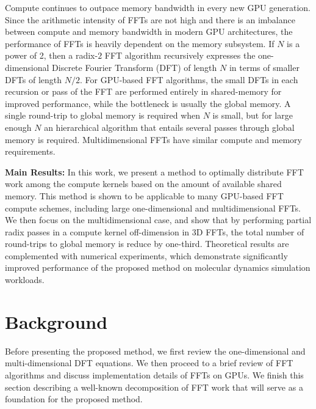 \documentclass{gtac}
\theoremstyle{problemstyle}
\begin{document}
Compute continues to outpace memory bandwidth in every new GPU
generation. Since the arithmetic intensity of FFTs are not high and
there is an imbalance between compute and memory bandwidth in modern GPU
architectures, the performance of FFTs is heavily dependent on the
memory subsystem. If $N$ is a power of 2, then a radix-$2$ FFT
algorithm recursively expresses the one-dimensional Discrete Fourier
Transform (DFT) of length $N$ in terms of smaller DFTs of length
$N/2$. For GPU-based FFT algorithms, the small DFTs in each recursion
or pass of the FFT are performed entirely in shared-memory for
improved performance, while the bottleneck is usually the global
memory. A single round-trip to global memory is required when $N$ is
small, but for large enough $N$ an hierarchical algorithm that entails
several passes through global memory is required. Multidimensional
FFTs have similar compute and memory requirements.

\textbf{Main Results:} In this work, we present a method to optimally
distribute FFT work among the compute kernels based on the amount of
available shared memory. This method is shown to be applicable to many
GPU-based FFT compute schemes, including large one-dimensional and
multidimensional FFTs. We then focus on the multidimensional case, and
show that by performing partial radix passes in a compute kernel
off-dimension in 3D FFTs, the total number of
round-trips to global memory is reduce by one-third. Theoretical results are complemented with numerical experiments, which demonstrate significantly improved performance of the proposed method on molecular dynamics simulation workloads.

\section{Background}

Before presenting the proposed method, we first review the one-dimensional and multi-dimensional DFT equations. We then proceed to a brief review of FFT algorithms and discuss implementation details of FFTs on GPUs. We finish this section describing a well-known decomposition of FFT work that will serve as a foundation for the proposed method. 
\end{document}
